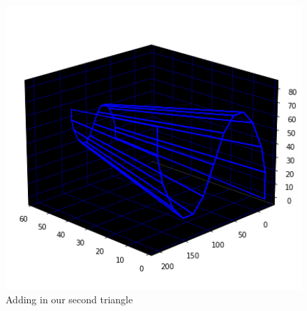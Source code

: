 \begin{figure}[H]
    \centering
    \begin{adjustbox}{width=9cm,center}
      \includegraphics[width=12cm]{src/webs/sine_wave_no_title.png}%
    \end{adjustbox}
  \caption{Adding in our second triangle}
\end{figure}
